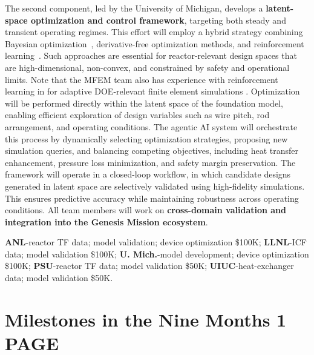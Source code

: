 The second component, led by the University of Michigan, develops a {\bf
latent-space optimization and control framework}, targeting both steady and
transient operating regimes.  This effort will employ a hybrid strategy
combining {\rm Bayesian optimization}~\cite{Morita2022BOCFD}, {\rm
derivative-free optimization methods}, and {\rm reinforcement
learning}~\cite{Font2025DRLFlowControl}.  Such approaches are essential for
reactor-relevant design spaces that are high-dimensional, non-convex, and
constrained by safety and operational limits. Note that the MFEM team also
has experience with reinforcement learning in for adaptive DOE-relevant
finite element simulations \cite{RL23}.
%
Optimization will be performed directly within the latent space of the
foundation model, enabling efficient exploration of design variables such as
wire pitch, rod arrangement, and operating conditions. The {\rm agentic AI
system} will orchestrate this process by dynamically selecting optimization
strategies, proposing new simulation queries, and balancing competing
objectives, including heat transfer enhancement, pressure loss minimization,
and safety margin preservation.
%
The framework will operate in a closed-loop workflow, in which candidate
designs generated in latent space are selectively validated using high-fidelity
simulations.  This ensures predictive accuracy while maintaining robustness
across operating conditions.
%
All team members will work on {\bf cross-domain validation and integration into the
Genesis Mission ecosystem}.



\vspace*{.1in}
   {\bf ANL}-reactor TF data; model validation; device optimization \$100K;
   {\bf LLNL}-ICF data; model validation \$100K;
   {\bf U. Mich.}-model development; device optimization \$100K;
   {\bf PSU}-reactor TF data; model validation \$50K;
   {\bf UIUC}-heat-exchanger data; model validation \$50K.


\section{  Milestones in the Nine Months \hspace{1.0in} 1 PAGE}



